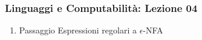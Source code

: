 




\begin{frame}[fragile]
	\frametitle{Linguaggi e Computabilità: Lezione 04}
\begin{enumerate}
\item
Passaggio Espressioni regolari a $\epsilon$-NFA
\end{enumerate}
\end{frame}



